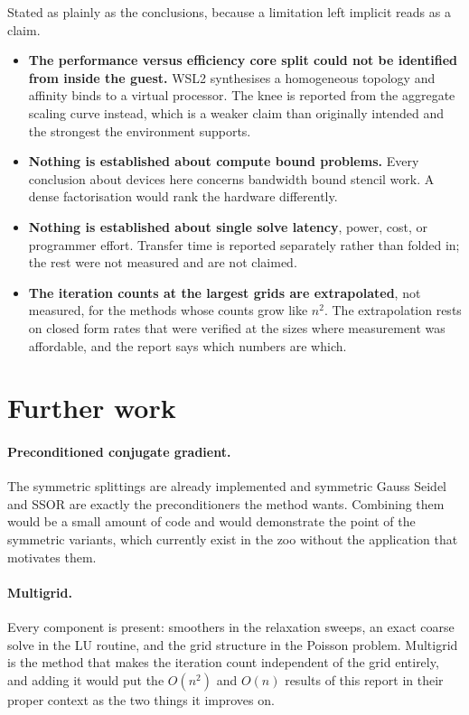 Stated as plainly as the conclusions, because a limitation left implicit reads
as a claim.

\begin{itemize}
  \item \textbf{The performance versus efficiency core split could not be
        identified from inside the guest.} WSL2 synthesises a homogeneous
        topology and affinity binds to a virtual processor. The knee is reported
        from the aggregate scaling curve instead, which is a weaker claim than
        originally intended and the strongest the environment supports.
  \item \textbf{Nothing is established about compute bound problems.} Every
        conclusion about devices here concerns bandwidth bound stencil work. A
        dense factorisation would rank the hardware differently.
  \item \textbf{Nothing is established about single solve latency}, power, cost,
        or programmer effort. Transfer time is reported separately rather than
        folded in; the rest were not measured and are not claimed.
  \item \textbf{The iteration counts at the largest grids are extrapolated}, not
        measured, for the methods whose counts grow like $n^2$. The
        extrapolation rests on closed form rates that were verified at the sizes
        where measurement was affordable, and the report says which numbers are
        which.
\end{itemize}

\section{Further work}

\paragraph{Preconditioned conjugate gradient.} The symmetric splittings are
already implemented and symmetric Gauss Seidel and SSOR are exactly the
preconditioners the method wants. Combining them would be a small amount of code
and would demonstrate the point of the symmetric variants, which currently exist
in the zoo without the application that motivates them.

\paragraph{Multigrid.} Every component is present: smoothers in the relaxation
sweeps, an exact coarse solve in the LU routine, and the grid structure in the
Poisson problem. Multigrid is the method that makes the iteration count
independent of the grid entirely, and adding it would put the $O(n^2)$ and
$O(n)$ results of this report in their proper context as the two things it
improves on.

